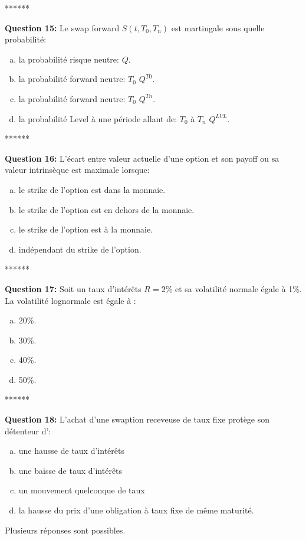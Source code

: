 \documentclass{article}
\newcommand{\indentitem}{\setlength\itemindent{25pt}}
\begin{document}
\smallskip
\centerline{******}
\smallskip
\textbf{Question 15:}
Le swap forward $S(t,T_0, T_n)$ est martingale sous quelle probabilité:
\begin{enumerate}[a)]
\indentitem \item la probabilité risque neutre: $Q$.
\indentitem \item la probabilité forward neutre: $T_0$ $Q^{T0}$.
\indentitem \item la probabilité forward neutre: $T_0$ $Q^{Tn}$.
\indentitem \item la probabilité Level à une période allant de: $T_0$ à $T_n$ $Q^{LVL}$.
\end{enumerate}
\smallskip
\centerline{******}
\smallskip
\newpage
\textbf{Question 16:}
L'écart entre valeur actuelle d'une option et son payoff ou sa valeur intrinsèque est maximale lorsque:
\begin{enumerate}[a)]
\indentitem \item le strike de l'option est dans la monnaie.
\indentitem \item le strike de l'option est en dehors de la monnaie.
\indentitem \item le strike de l'option est à la monnaie.
\indentitem \item indépendant du strike de l'option.
\end{enumerate}
\smallskip
\centerline{******}
\smallskip
\textbf{Question 17:}
Soit un taux d’intérêts $R=2\%$ et sa volatilité normale égale à 1\%. La volatilité lognormale est égale à :
\begin{enumerate}[a)]
\indentitem \item 20\%.
\indentitem \item 30\%.
\indentitem \item 40\%.
\indentitem \item 50\%.
\end{enumerate}
\smallskip
\centerline{******}
\smallskip
\textbf{Question 18:}
L’achat d’une swaption receveuse de taux fixe protège son détenteur d':
\begin{enumerate}[a)]
\indentitem \item une hausse de taux d’intérêts
\indentitem \item une baisse de taux d’intérêts
\indentitem \item un mouvement quelconque de taux
\indentitem \item la hausse du prix d’une obligation à taux fixe de même maturité.
\end{enumerate}
Plusieurs réponses sont possibles.
\end{document}
